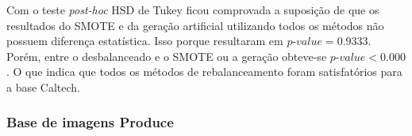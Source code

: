 
Com o teste \textit{post-hoc} HSD de Tukey ficou comprovada a suposição de que os resultados do SMOTE e da geração artificial utilizando todos os métodos não possuem diferença estatística. Isso porque resultaram em $\textit{p-value} = 0.9333$. Porém, entre o desbalanceado e o SMOTE ou a geração obteve-se $\textit{p-value} < 0.000$. O que indica que todos os métodos de rebalanceamento foram satisfatórios para a base Caltech.



\subsubsection{Base de imagens Produce}


